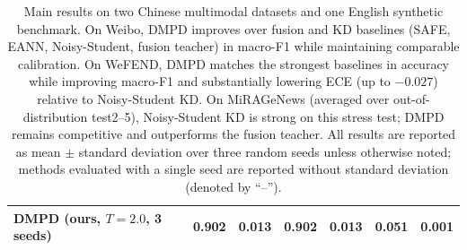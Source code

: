 \begin{table}[t]
\begin{tabular}{l
  c@{\,±\,}c
  c@{\,±\,}c
  c@{\,±\,}c}
\textbf{DMPD (ours, $T{=}2.0$, 3 seeds)} & 0.902 & 0.013 & 0.902 & 0.013 & \textbf{0.051} & \textbf{0.001} \\
\bottomrule
\end{tabular}
\caption{Main results on two Chinese multimodal datasets and one English synthetic benchmark. On Weibo, DMPD improves over fusion and KD baselines (SAFE, EANN, Noisy-Student, fusion teacher) in macro-F1 while maintaining comparable calibration. On WeFEND, DMPD matches the strongest baselines in accuracy while improving macro-F1 and substantially lowering ECE (up to \(-0.027\)) relative to Noisy-Student KD. On MiRAGeNews (averaged over out-of-distribution test2--5), Noisy-Student KD is strong on this stress test; DMPD remains competitive and outperforms the fusion teacher. All results are reported as mean $\pm$ standard deviation over three random seeds unless otherwise noted; methods evaluated with a single seed are reported without standard deviation (denoted by ``--'').}
\label{tab:main}
\end{table}
